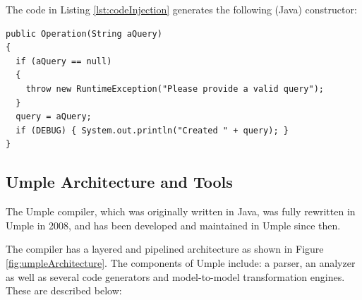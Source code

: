 The code in Listing \ref{lst:codeInjection} generates the following (Java) constructor:

\begin{lstlisting}[style=java, caption=Generated constructor after code injection]
public Operation(String aQuery)
{
  if (aQuery == null)  
  {  
    throw new RuntimeException("Please provide a valid query");  
  }
  query = aQuery;
  if (DEBUG) { System.out.println("Created " + query); }
} 
\end{lstlisting}

\subsection{Umple Architecture and Tools}

The Umple compiler, which was originally written in Java, was fully rewritten in Umple in 2008, and has been developed and maintained in Umple since then. 

The compiler has a layered and pipelined architecture as shown in Figure \ref{fig:umpleArchitecture}. 
The components of Umple include: a parser, an analyzer as well as several code generators and model-to-model transformation engines. These are described below:

